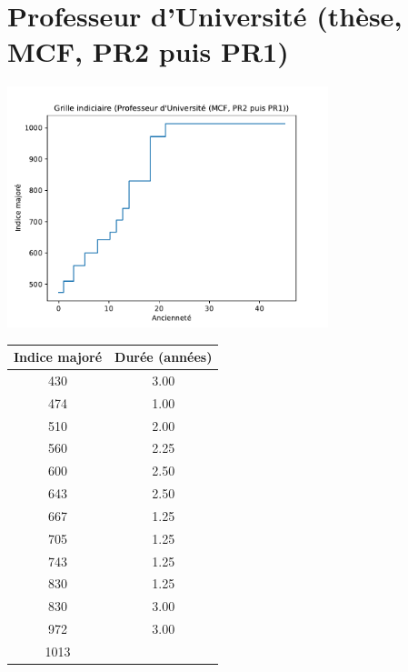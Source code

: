 \newpage 
 
\chapter{Professeur d'Université (thèse, MCF, PR2 puis PR1)} 

\begin{minipage}{0.55\linewidth}\includegraphics[width=0.7\textwidth]{fig/grille_PR.pdf}\end{minipage} 
\begin{minipage}{0.3\linewidth} 
 \begin{center} 

\begin{tabular}[htb]{|c|c|} 
\hline 
 Indice majoré &  Durée (années) \\ 
\hline \hline 
 430 &  3.00 \\ 
\hline 
 474 &  1.00 \\ 
\hline 
 510 &  2.00 \\ 
\hline 
 560 &  2.25 \\ 
\hline 
 600 &  2.50 \\ 
\hline 
 643 &  2.50 \\ 
\hline 
 667 &  1.25 \\ 
\hline 
 705 &  1.25 \\ 
\hline 
 743 &  1.25 \\ 
\hline 
 830 &  1.25 \\ 
\hline 
 830 &  3.00 \\ 
\hline 
 972 &  3.00 \\ 
\hline 
 1013 &   \\ 
\hline 
\hline 
\end{tabular} 
\end{center} 
 \end{minipage} 


 \addto{\captionsenglish}{ \renewcommand{\mtctitle}{}} \setcounter{minitocdepth}{2} 
 \minitoc \newpage 

